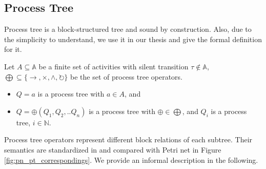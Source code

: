 \subsection{Process Tree}
Process tree is a block-structured tree and sound by construction\cite{van2016data}. Also, due to the simplicity to understand, we use it in our thesis and give the formal definition for it.
\begin{definition}
Let $ A \subseteq \mathbb{A} $ be a finite set of activities with silent transition $\tau \notin \mathbb{A}$, $\bigoplus \subseteq \{\rightarrow, \times, \land, \circlearrowright\}$ be the set of process tree operators. 
\begin{itemize}
\item $Q=a$ is a process tree with $a\in A$, and 
\item $Q= \oplus (Q_1 , Q_2 ,.. Q_n)$ is a process tree with $\oplus \in \bigoplus$, and $Q_i$ is a process tree, $i \in \mathbb{N}$. 
\end{itemize}
\end{definition}
Process tree operators represent different block relations of each subtree. Their semantics are standardized in \cite{vanderAalst:2016:PMD:2948762, Buijs2012OnTR} and compared with Petri net in Figure \ref{fig:pn_pt_correspondings}\cite{Buijs2012OnTR}. We provide an informal description in the following.
